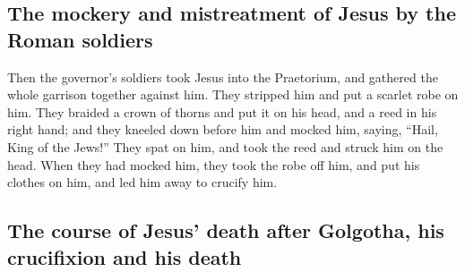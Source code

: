 \begin{paracol}{2}
\begin{otherlanguage}{english}
\hypertarget{the-mockery-and-mistreatment-of-jesus-by-the-roman-soldiers}{%
\subsection{The mockery and mistreatment of Jesus by the Roman
soldiers}\label{the-mockery-and-mistreatment-of-jesus-by-the-roman-soldiers}}

 Then the governor's soldiers took Jesus into the
Praetorium, and gathered the whole garrison together against him.
 They stripped him and put a scarlet robe on him.
 They braided a crown of thorns and put it on his head,
and a reed in his right hand; and they kneeled down before him and
mocked him, saying, ``Hail, King of the Jews!''  They
spat on him, and took the reed and struck him on the head.
 When they had mocked him, they took the robe off him,
and put his clothes on him, and led him away to crucify him.

\hypertarget{the-course-of-jesus-death-after-golgotha-his-crucifixion-and-his-death}{%
\subsection{The course of Jesus' death after Golgotha, his crucifixion
and his
death}\label{the-course-of-jesus-death-after-golgotha-his-crucifixion-and-his-death}}


\end{otherlanguage}
\end{paracol}
